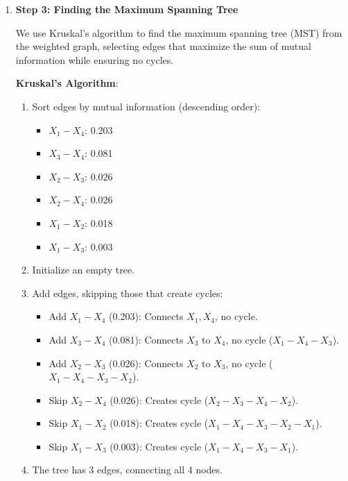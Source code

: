 \documentclass[a3paper,12pt]{extarticle} %
\begin{document}
\begin{enumerate}
We construct a complete undirected graph with nodes \(X_1, X_2, X_3, X_4\), where each edge \((X_i, X_j)\) is weighted by the mutual information \(I(X_i; X_j)\).

\textbf{Graph Representation}:
\[
\begin{tikzpicture}
    \node[circle, draw] (X1) at (0,2) {$X_1$};
    \node[circle, draw] (X2) at (2,2) {$X_2$};
    \node[circle, draw] (X3) at (2,0) {$X_3$};
    \node[circle, draw] (X4) at (0,0) {$X_4$};
    \draw (X1) -- (X2) node[midway, above] {0.018};
    \draw (X1) -- (X3) node[midway, right] {0.003};
    \draw (X1) -- (X4) node[midway, left] {0.203};
    \draw (X2) -- (X3) node[midway, right] {0.026};
    \draw (X2) -- (X4) node[midway, below] {0.026};
    \draw (X3) -- (X4) node[midway, below] {0.081};
\end{tikzpicture}
\]

\item \textbf{Step 3: Finding the Maximum Spanning Tree}

We use Kruskal's algorithm to find the maximum spanning tree (MST) from the weighted graph, selecting edges that maximize the sum of mutual information while ensuring no cycles.

\textbf{Kruskal's Algorithm}:
\begin{enumerate}
    \item Sort edges by mutual information (descending order):
    \begin{itemize}
        \item \(X_1 - X_4\): 0.203
        \item \(X_3 - X_4\): 0.081
        \item \(X_2 - X_3\): 0.026
        \item \(X_2 - X_4\): 0.026
        \item \(X_1 - X_2\): 0.018
        \item \(X_1 - X_3\): 0.003
    \end{itemize}
    \item Initialize an empty tree.
    \item Add edges, skipping those that create cycles:
    \begin{itemize}
        \item Add \(X_1 - X_4\) (0.203): Connects \(X_1, X_4\), no cycle.
        \item Add \(X_3 - X_4\) (0.081): Connects \(X_3\) to \(X_4\), no cycle (\(X_1 - X_4 - X_3\)).
        \item Add \(X_2 - X_3\) (0.026): Connects \(X_2\) to \(X_3\), no cycle (\(X_1 - X_4 - X_3 - X_2\)).
        \item Skip \(X_2 - X_4\) (0.026): Creates cycle (\(X_2 - X_3 - X_4 - X_2\)).
        \item Skip \(X_1 - X_2\) (0.018): Creates cycle (\(X_1 - X_4 - X_3 - X_2 - X_1\)).
        \item Skip \(X_1 - X_3\) (0.003): Creates cycle (\(X_1 - X_4 - X_3 - X_1\)).
    \end{itemize}
    \item The tree has 3 edges, connecting all 4 nodes.
\end{enumerate}


\end{enumerate}
\end{document}
